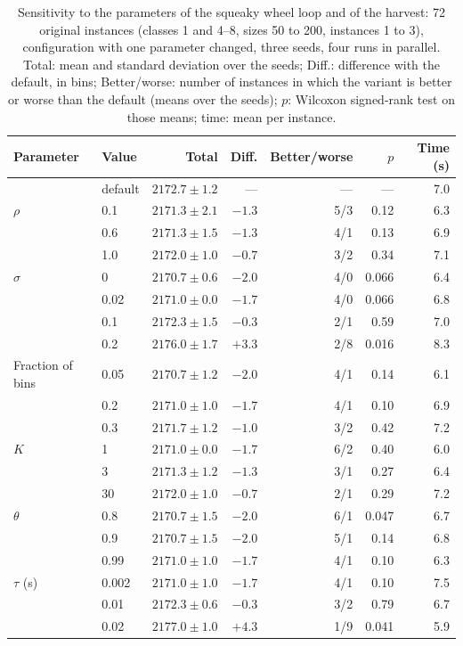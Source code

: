 \begin{table}[t]
\centering
\small\setlength{\tabcolsep}{4pt}
\caption{Sensitivity to the parameters of the squeaky wheel loop and of the harvest: 72 original instances (classes 1 and 4--8, sizes 50 to 200, instances 1 to 3), configuration \cfgfast{} with one parameter changed, three seeds, four runs in parallel.
Total: mean and standard deviation over the seeds; Diff.: difference with the default, in bins; Better/worse: number of instances in which the variant is better or worse than the default (means over the seeds); $p$: Wilcoxon signed-rank test on those means; time: mean per instance.}
\label{tab:e-sens}
\begin{tabular}{@{}llrrrrr@{}}
\toprule
Parameter & Value & Total & Diff. & Better/worse & $p$ & Time (s)\\
\midrule
 & default & $2172.7\pm 1.2$ & --- & --- & --- & 7.0\\
\midrule
$\rho$ & 0.1 & $2171.3\pm 2.1$ & $-1.3$ & 5/3 & 0.12 & 6.3\\
 & 0.6 & $2171.3\pm 1.5$ & $-1.3$ & 4/1 & 0.13 & 6.9\\
 & 1.0 & $2172.0\pm 1.0$ & $-0.7$ & 3/2 & 0.34 & 7.1\\
$\sigma$ & 0 & $2170.7\pm 0.6$ & $-2.0$ & 4/0 & 0.066 & 6.4\\
 & 0.02 & $2171.0\pm 0.0$ & $-1.7$ & 4/0 & 0.066 & 6.8\\
 & 0.1 & $2172.3\pm 1.5$ & $-0.3$ & 2/1 & 0.59 & 7.0\\
 & 0.2 & $2176.0\pm 1.7$ & $+3.3$ & 2/8 & 0.016 & 8.3\\
Fraction of bins & 0.05 & $2170.7\pm 1.2$ & $-2.0$ & 4/1 & 0.14 & 6.1\\
 & 0.2 & $2171.0\pm 1.0$ & $-1.7$ & 4/1 & 0.10 & 6.9\\
 & 0.3 & $2171.7\pm 1.2$ & $-1.0$ & 3/2 & 0.42 & 7.2\\
$K$ & 1 & $2171.0\pm 0.0$ & $-1.7$ & 6/2 & 0.40 & 6.0\\
 & 3 & $2171.3\pm 1.2$ & $-1.3$ & 3/1 & 0.27 & 6.4\\
 & 30 & $2172.0\pm 1.0$ & $-0.7$ & 2/1 & 0.29 & 7.2\\
$\theta$ & 0.8 & $2170.7\pm 1.5$ & $-2.0$ & 6/1 & 0.047 & 6.7\\
 & 0.9 & $2170.7\pm 1.5$ & $-2.0$ & 5/1 & 0.14 & 6.8\\
 & 0.99 & $2171.0\pm 1.0$ & $-1.7$ & 4/1 & 0.10 & 6.3\\
$\tau$ (s) & 0.002 & $2171.0\pm 1.0$ & $-1.7$ & 4/1 & 0.10 & 7.5\\
 & 0.01 & $2172.3\pm 0.6$ & $-0.3$ & 3/2 & 0.79 & 6.7\\
 & 0.02 & $2177.0\pm 1.0$ & $+4.3$ & 1/9 & 0.041 & 5.9\\
\bottomrule
\end{tabular}
\end{table}

